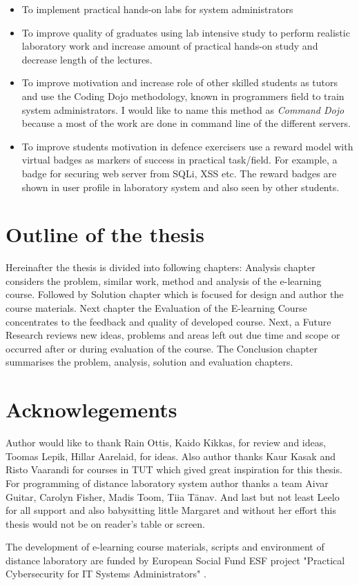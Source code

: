 \begin{itemize}
\item To implement practical hands-on labs for system administrators
\item To improve quality of graduates using lab intensive study  to perform realistic laboratory work and increase amount of practical hands-on study and decrease length of the lectures.
\item To improve motivation and increase role of other skilled students as tutors and use the \gls{Coding Dojo} methodology, known in programmers field to train system administrators. I would like to name this method as \emph{Command Dojo} because a most of the work are done in command line of the different servers.
\item To improve students motivation in defence exercisers use a reward model with virtual badges as markers of success in practical task/field. For example, a badge for securing web server from \gls{SQLi}, \gls{XSS} etc. The reward badges are shown in user profile in laboratory system and also seen by other students.
\end{itemize}
\par


\section{Outline of the thesis}
Hereinafter the thesis is divided into following chapters: Analysis chapter considers the problem, similar work, method and analysis of the e-learning course. Followed by Solution chapter which is focused for design and author the course materials. Next chapter the Evaluation of the E-learning Course concentrates to the feedback and quality of developed course. Next, a Future Research reviews new ideas, problems and areas left out due time and scope or occurred after or during evaluation of the course. The Conclusion chapter summarises the problem, analysis, solution and evaluation chapters.



\section{Acknowlegements}
Author would like to thank Rain Ottis, Kaido Kikkas, for review and ideas, Toomas Lepik, Hillar Aarelaid, for ideas. Also author thanks Kaur Kasak and Risto Vaarandi for courses in TUT which gived great inspiration for this thesis. For programming of distance laboratory system author thanks a team Aivar Guitar, Carolyn Fisher, Madis Toom, Tiia Tänav. And last but not least Leelo for all support and also babysitting little Margaret and without her effort this thesis would not be on reader's table or screen.

The development of e-learning course materials, scripts and environment of distance laboratory are funded by European Social Fund \gls{ESF} project "Practical Cybersecurity for IT Systems Administrators" \citep{website:ESF_project}.

